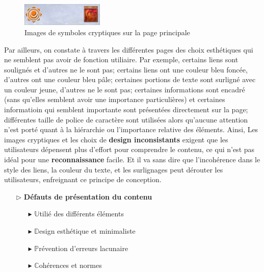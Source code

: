\documentclass[9pt]{report}
\begin{document}
\begin{multicols*}{2}
  \begin{figure}[H]
    \begin{center}
      \includegraphics[width=0.35\textwidth]{ImageConfondantes2.png}
    \end{center}
    \caption{Images de symboles cryptiques sur la page principale}
  \end{figure}

  Par ailleurs, on constate à travers les différentes pages 
  des choix esthétiques qui ne semblent pas avoir de fonction utiliaire. 
  Par exemple, certains liens sont soulignés et d'autres ne le sont pas; 
  certains liens ont une couleur bleu foncée, d'autres ont une couleur bleu pâle; 
  certaines portions de texte sont surligné avec un couleur jeune, d'autres ne le sont pas; 
  certaines informations sont encadré (sans qu'elles semblent avoir une importance 
  particulières) et certaines informatioin qui semblent importante sont présentées 
  directement sur la page; différentes taille de police de caractère sont utilisées 
  alors qu'aucune  attention n'est porté quant à la hiérarchie 
  ou l'importance relative des éléments. Ainsi, 
  Les images cryptiques et les choix de \textbf{design inconsistants}
  exigent que les utilisateurs
  dépensent plus d'effort pour comprendre le contenu, ce qui n'est pas 
  idéal pour une \textbf{reconnaissance} facile. Et il va 
  sans dire que  l'incohérence dans le style des liens, la couleur du texte, 
  et les surlignages peut dérouter les utilisateurs, 
  enfreignant ce principe de conception.

  \begin{itemize}
    \item [$\rhd$ ] \textbf{Défauts de présentation du contenu}  
      \begin{itemize}
        \item [$\blacktriangleright$ ] $\mathbb{U}$tilié des différents éléments 
        \item [$\blacktriangleright$ ] $\mathbb{D}$esign esthétique et minimaliste 
        \item [$\blacktriangleright$ ] $\mathbb{P}$révention d'erreurs lacunaire
        \item [$\blacktriangleright$ ] $\mathbb{C}$ohérences et normes
      \end{itemize}
  \end{itemize}




\end{multicols*}
\end{document}
